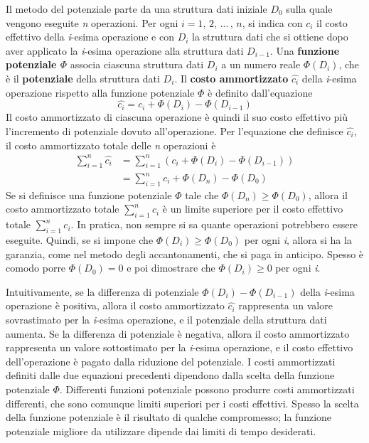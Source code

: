 \documentclass[10pt, a4paper]{report}
\begin{document}
Il metodo del potenziale parte da una struttura dati iniziale $D_0$ sulla quale vengono eseguite \textit{n} operazioni. Per ogni $i = 1,\,2,\,...\,,\,n$, si indica con $c_i$ il costo effettivo della \textit{i}-esima operazione e con $D_i$ la struttura dati che si ottiene dopo aver applicato la \textit{i}-esima operazione alla struttura dati $D_{i-1}$. Una \textbf{funzione potenziale $\Phi$} associa ciascuna struttura dati $D_i$ a un numero reale $\Phi(D_i)$, che è il \textbf{potenziale} della struttura dati $D_i$. Il \textbf{costo ammortizzato} $\widehat{c_i}$ della \textit{i}-esima operazione rispetto alla funzione potenziale $\Phi$ è definito dall'equazione
\begin{equation*}
\widehat{c_i} = c_i + \Phi(D_i) - \Phi(D_{i-1})
\end{equation*}
Il costo ammortizzato di ciascuna operazione è quindi il suo costo effettivo più l'incremento di potenziale dovuto all'operazione. Per l'equazione che definisce $\widehat{c_i}$, il costo ammortizzato totale delle \textit{n} operazioni è
\begin{align*}
\sum_{i=1}^{n}\widehat{c_i} &= \sum_{i=1}^{n}(c_i + \Phi(D_i) - \Phi(D_{i-1}))\\
&= \sum_{i=1}^{n}c_i + \Phi(D_n) - \Phi(D_0)
\end{align*}
Se si definisce una funzione potenziale $\Phi$ tale che $\Phi(D_n) \geq \Phi(D_0)$, allora il costo ammortizzato totale $\sum_{i=1}^{n}\widehat{c_i}$ è un limite superiore per il costo effettivo totale $\sum_{i=1}^{n}c_i$. In pratica, non sempre si sa quante operazioni potrebbero essere eseguite. Quindi, se si impone che $\Phi(D_i) \geq \Phi(D_0)$ per ogni \textit{i}, allora si ha la garanzia, come nel metodo degli accantonamenti, che si paga in anticipo. Spesso è comodo porre $\Phi(D_0) = 0$ e poi dimostrare che $\Phi(D_i) \geq 0$ per ogni \textit{i}.

Intuitivamente, se la differenza di potenziale $\Phi(D_i) - \Phi(D_{i-1})$ della \textit{i}-esima operazione è positiva, allora il costo ammortizzato $\widehat{c_i}$ rappresenta un valore sovrastimato per la \textit{i}-esima operazione, e il potenziale della struttura dati aumenta. Se la differenza di potenziale è negativa, allora il costo ammortizzato rappresenta un valore sottostimato per la \textit{i}-esima operazione, e il costo effettivo dell'operazione è pagato dalla riduzione del potenziale. I costi ammortizzati definiti dalle due equazioni precedenti dipendono dalla scelta della funzione potenziale $\Phi$. Differenti funzioni potenziale possono produrre costi ammortizzati differenti, che sono comunque limiti superiori per i costi effettivi. Spesso la scelta della funzione potenziale è il risultato di qualche compromesso; la funzione potenziale migliore da utilizzare dipende dai limiti di tempo desiderati.\\
\end{document}
